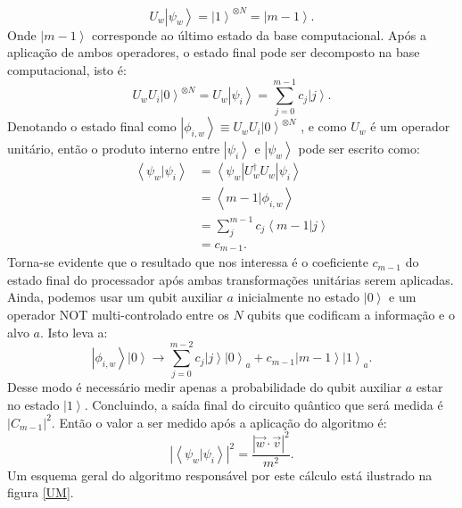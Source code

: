 \begin{equation}U_{w}\left|\psi_{w}\right\rangle =\left|1\right\rangle ^{\otimes N}=\left|m-1\right\rangle. \end{equation}
Onde $\left|m-1\right\rangle$  corresponde ao último estado da base computacional. Após a aplicação de ambos operadores, o estado final  pode ser decomposto na base computacional, isto é:
\begin{equation}U_{w}U_{i}\left|0\right\rangle ^{\otimes N}=U_{w}\left|\psi_{i}\right\rangle =\sum_{j=0}^{m-1}c_{j}\left|j\right\rangle . \end{equation}
Denotando o estado final como $\left|\phi_{i,w}\right\rangle \equiv U_{w}U_{i}\left|0\right\rangle  ^{\otimes N}$ , e como $U_{w}$ é um operador unitário, então o produto interno entre $\left|\psi_{i}\right\rangle $ e $\left|\psi_{w}\right\rangle $ pode ser escrito como:
\begin{equation}
\begin{split}
\left\langle \psi_{w} | \psi_{i} \right\rangle & =\left\langle \psi_{w} \left| U_{w}^{\dagger}U_{w} \right| \psi_{i} \right\rangle \\
&  =\left\langle m-1|\phi_{i,w}\right\rangle \\
& =\sum_{j}^{m-1}c_{j}\left\langle m-1|j\right\rangle \\
& = c_{m-1}.
\end{split}
\end{equation}
Torna-se evidente que o resultado que nos interessa é o coeficiente $c_{m-1} $ do estado final do  processador após ambas transformações unitárias serem aplicadas. Ainda, podemos usar um qubit auxiliar $a$  inicialmente no estado $\left|0\right\rangle $  e um operador NOT multi-controlado entre os $N$ qubits que codificam a informação e o alvo $a$. Isto leva a:
\begin{equation}\left|\phi_{i,w}\right\rangle \left|0\right\rangle \rightarrow\sum_{j=0}^{m-2}c_{j}\left|j\right\rangle \left|0\right\rangle _{a}+c_{m-1}\left|m-1\right\rangle \left|1\right\rangle _{a}. \end{equation}
Desse modo é necessário medir apenas a probabilidade do qubit auxiliar $a$ estar no estado $\left|1\right\rangle$. Concluindo, a saída final do circuito quântico que será medida é  $\left|C_{m-1}\right|^{2}$. Então o valor a ser medido após a aplicação do algoritmo é:
\begin{equation}\left|\left\langle \psi_{w}|\psi_{i}\right\rangle \right|^{2}=\frac{\left|\overrightarrow{w}\cdot\overrightarrow{v}\right|^{2}}{m^{2}}. \end{equation} 
Um esquema geral do algoritmo responsável por este cálculo está ilustrado na figura \ref{UM}. 

